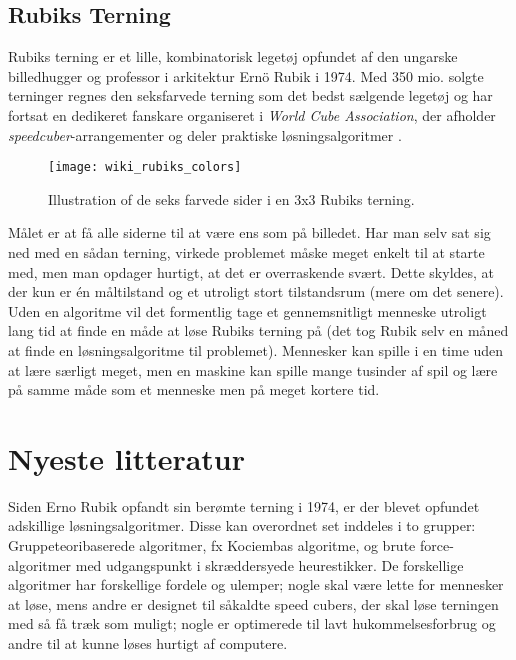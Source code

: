 \documentclass[../main.tex]{subfiles}
\begin{document}
\subsection{Rubiks Terning}

Rubiks terning er et lille, kombinatorisk legetøj opfundet af den ungarske billedhugger og professor i arkitektur Ernö Rubik i 1974. Med 350 mio. solgte terninger regnes den seksfarvede terning som det bedst sælgende legetøj og har fortsat en dedikeret fanskare organiseret i \textit{World Cube Association}, der afholder \textit{speedcuber}-arrangementer og deler praktiske løsningsalgoritmer \cite{RubiksWiki}. 
\begin{figure}[H]
	\centering 
	\texttt{[image: wiki\_rubiks\_colors]}
	\caption{Illustration of de seks farvede sider i en 3x3 Rubiks terning.\protect\footnotemark}
\end{figure}
\noindent Målet er at få alle siderne til at være ens som på billedet. 
Har man selv sat sig ned med en sådan terning, virkede problemet måske meget enkelt til at starte med, men man opdager hurtigt, at det er overraskende svært.
Dette skyldes, at der kun er én måltilstand og et utroligt stort tilstandsrum (mere om det senere).
Uden en algoritme vil det formentlig tage et gennemsnitligt menneske utroligt lang tid at finde en måde at løse Rubiks terning på (det tog Rubik selv en måned at finde en løsningsalgoritme til problemet). 
Mennesker kan spille i en time uden at lære særligt meget, men en maskine kan spille mange tusinder af spil og lære på samme måde som et menneske men på meget kortere tid. 



\section{Nyeste litteratur}
\cite{RubiksMedium}
Siden Erno Rubik opfandt sin berømte terning i 1974, er der blevet opfundet adskillige løsningsalgoritmer.
Disse kan overordnet set inddeles i to grupper:
Gruppeteoribaserede algoritmer, fx Kociembas algoritme, og brute force-algoritmer med udgangspunkt i skræddersyede heurestikker.
De forskellige algoritmer har forskellige fordele og ulemper;
nogle skal være lette for mennesker at løse, mens andre er designet til såkaldte speed cubers, der skal løse terningen med så få træk som muligt;
nogle er optimerede til lavt hukommelsesforbrug og andre til at kunne løses hurtigt af computere. 
\end{document}
